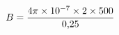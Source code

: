 \documentclass[preview]{standalone}
\begin{document}
\begin{align*}
\special{dvisvgm:raw <g id='unique000'>}B=\frac{4\pi\times10^{-7}\times2\times500}{0{,}25}\special{dvisvgm:raw </g>}
\end{align*}
\end{document}
